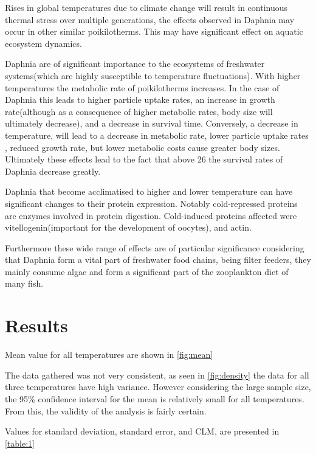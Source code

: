 \documentclass[a4paper, british]{article}
\begin{document}
Rises in global temperatures due to climate change will result in continuous thermal stress over multiple generations, the effects observed in Daphnia may occur in other similar poikilotherms.
This may have significant effect on aquatic ecosystem dynamics.\cite{khanEffectTemperatureWaterflea2008}

Daphnia are of significant importance to the ecosystems of freshwater systems(which are highly susceptible to temperature fluctuations). With higher temperatures the metabolic rate of poikilotherms increases. In the case of Daphnia this leads to higher particle uptake rates, an increase in growth rate(although as a consequence of higher metabolic rates, body size will ultimately decrease), and a decrease in survival time. Conversely,  a decrease in temperature, will lead to a decrease in metabolic rate, lower particle uptake rates , reduced growth rate, but lower metabolic costs cause greater body sizes. Ultimately these effects lead to the fact that above 26 \textcelsius{} the survival rates of Daphnia decrease greatly.\cite{mullerTemperaturedrivenResponseReversibility2018}

Daphnia that become acclimatised to higher and lower temperature can have significant changes to their protein expression. Notably cold-repressed proteins are enzymes involved in protein digestion. Cold-induced proteins affected were vitellogenin(important for the development of oocytes), and actin.\cite{schwerinAcclimatoryResponsesDaphnia2009}

Furthermore these wide range of effects are of particular significance considering that Daphnia form a vital part of freshwater food chains, being filter feeders, they mainly consume algae and form a significant part of the zooplankton diet of many fish.\cite{santosoCardiovascularPerformanceMeasurement2020}

\section{Results}

Mean value for all temperatures are shown in \cref{fig:mean}

The data gathered was not very consistent, as seen in \cref{fig:density} the data for all three temperatures have high variance. However considering the large sample size, the 95\% confidence interval for the mean is relatively small for all temperatures. From this, the validity of the analysis is fairly certain.

Values for standard deviation, standard error, and CLM, are presented in \cref{table:1}
\end{document}
